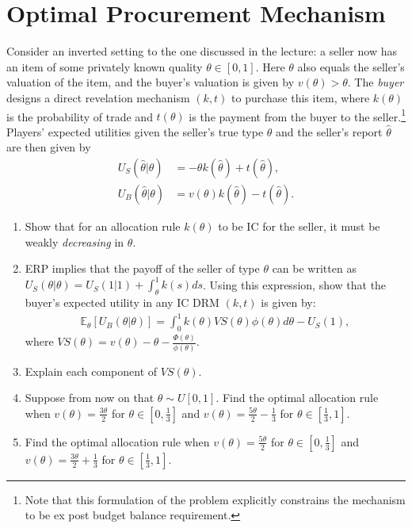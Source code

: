 \documentclass[a4paper]{article}
\begin{document}
\section{Optimal Procurement Mechanism}
	Consider an inverted setting to the one discussed in the lecture: a seller now has an item of some privately known quality $\theta \in [0,1]$. Here $\theta$ also equals the seller's valuation of the item, and the buyer's valuation is given by $v(\theta) > \theta$. The \emph{buyer} designs a direct revelation mechanism $(k,t)$ to purchase this item, where $k(\theta)$ is the probability of trade and $t(\theta)$ is the payment from the buyer to the seller.\footnote{Note that this formulation of the problem explicitly constrains the mechanism to be ex post budget balance requirement.} Players' expected utilities given the seller's true type $\theta$ and the seller's report $\hat{\theta}$ are then given by
	\begin{align*}
		U_S(\hat{\theta}|\theta) &= -\theta k(\hat{\theta}) + t(\hat{\theta}),
		\\
		U_B(\hat{\theta}|\theta) &= v(\theta) k(\hat{\theta}) - t(\hat{\theta}).
	\end{align*}
	\begin{enumerate}
		\item Show that for an allocation rule $k(\theta)$ to be IC for the seller, it must be weakly \emph{decreasing} in $\theta$.
		\item ERP implies that the payoff of the seller of type $\theta$ can be written as $U_S(\theta|\theta) = U_S(1|1) + \int_{\theta}^{1} k(s) ds $. Using this expression, show that the buyer's expected utility in any IC DRM $(k,t)$ is given by:
		\begin{align*}
			\mathbb{E}_\theta [ U_B(\theta | \theta) ] = \int_0^1 k(\theta) VS(\theta) \phi(\theta) d\theta - U_S(1),
		\end{align*}
		where $VS(\theta) = v(\theta) - \theta - \frac{\Phi(\theta)}{\phi(\theta)}$.
		\item Explain each component of $VS(\theta)$.
		\item Suppose from now on that $\theta \sim U[0,1]$. Find the optimal allocation rule when $v(\theta) = \frac{3\theta}{2}$ for $\theta \in [0,\frac{1}{3}]$ and $v(\theta) = \frac{5\theta}{2}-\frac{1}{3}$ for $\theta \in [\frac{1}{3},1]$.
		\item Find the optimal allocation rule when $v(\theta) = \frac{5\theta}{2}$ for $\theta \in [0,\frac{1}{3}]$ and $v(\theta) = \frac{3\theta}{2}+\frac{1}{3}$ for $\theta \in [\frac{1}{3},1]$.
	\end{enumerate}
		
\end{document}
